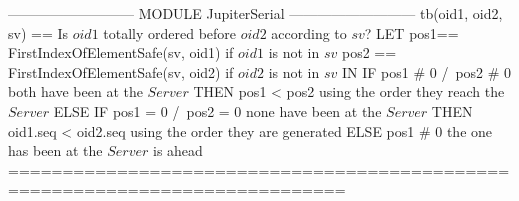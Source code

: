 \documentclass{article}
\begin{document}
\begin{tla}
--------------------------- MODULE JupiterSerial ---------------------------
tb(oid1, oid2, sv) == \* Is $oid1$ totally ordered before $oid2$ according to $sv$?
    LET  pos1== FirstIndexOfElementSafe(sv, oid1)  if $oid1$ is not in $sv$
        pos2 == FirstIndexOfElementSafe(sv, oid2)  if $oid2$ is not in $sv$
    IN  IF pos1 # 0 /\ pos2 # 0 \* both have been at the $Server$
        THEN pos1 < pos2        \* using the order they reach the $Server$
        ELSE IF pos1 = 0 /\ pos2 = 0  \* none have been at the $Server$
             THEN oid1.seq < oid2.seq \* using the order they are generated
             ELSE pos1 # 0 \* the one has been at the $Server$ is ahead
=============================================================================
\end{tla}
\end{document}
